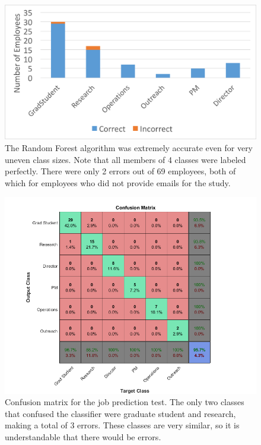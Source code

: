 \documentclass[12pt]{report}
\begin{document}
\begin{figure}[t]
    \centering
    \includegraphics[width=\columnwidth,trim={1mm 2mm 1mm 3mm},clip]{Prediction_50_50_RF}
    \vspace{-20pt}
    \caption[Job title classification results]{The Random Forest algorithm was extremely accurate even for very uneven class sizes.  Note that all members of 4 classes were labeled perfectly.  There were only 2 errors out of 69 employees, both of which for employees who did not provide emails for the study.}
    \label{fig:result_hist}
\end{figure}


\begin{figure}[t]
    \centering
        \includegraphics[width=.9\columnwidth,trim={1mm 6mm 1mm 3.5mm},clip]{class_confusion_mat}
        \vspace{-7pt}
        \caption[Job title prediction confusion matrix]{Confusion matrix for the job prediction test.  The only two classes that confused the classifier were graduate student and research, making a total of 3 errors.  These classes are very similar, so it is understandable that there would be errors.}
        \label{fig:conf_matrix}
\end{figure}
\end{document}
